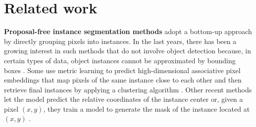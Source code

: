
\section{Related work} \label{sec:related_work}

\textbf{Proposal-free instance segmentation methods} adopt a bottom-up approach by directly grouping pixels into instances. In the last years, there has been a growing interest in such  methods that do not involve object detection because, in certain types of data, object instances cannot be approximated by bounding boxes \cite{kirillov2017instancecut,bai2017deep}. 
Some use metric learning to predict high-dimensional associative pixel embeddings that map pixels of the same instance close to each other \cite{lee2019learning,fathi2017semantic,newell2017associative,de2017semantic}
and then retrieve final instances by applying a clustering algorithm \cite{kong2018recurrentPix}.
Other recent methods let the model predict the relative coordinates of the instance center \cite{neven2019instance,cheng2019panopticdeeplab} or, given a pixel $(x,y)$, they train a model to generate the mask of the instance located at $(x,y)$ \cite{sofiiuk2019adaptis}. 

